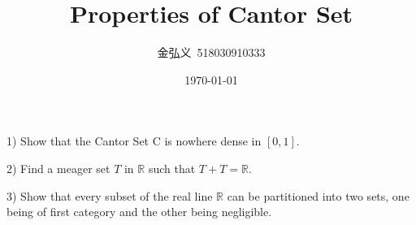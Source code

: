 \documentclass[a4paper, linespread=1.5]{article}
\begin{document}
    \title{Properties of Cantor Set}
    \author{金弘义\ 518030910333}
    \date{\today}
    \maketitle
    
    \begin{customex}{1}
    	
        1) Show that the Cantor Set C is nowhere dense in $[0, 1]$.
        
        2) Find a meager set $T$ in $\mathbb{R}$ such that $T+T=\mathbb{R}$.
        
        3) Show that every subset of the real line $\mathbb{R}$ can be partitioned into two sets, one being of first category and the other being negligible. 
    \end{customex}
\end{document}
